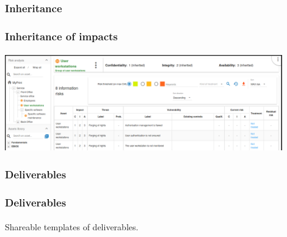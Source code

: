 \subsubsection{Inheritance}
\begin{frame}
    \frametitle{Inheritance of impacts}
    \framesubtitle{}
    \begin{center}
        \begin{center}
            \includegraphics[width=12cm]{./images/impacts-inheritance.png}
        \end{center}
    \end{center}
\end{frame}

\subsubsection{Deliverables}
\begin{frame}
    \frametitle{Deliverables}
    \framesubtitle{}
    Shareable templates of deliverables.
\end{frame}
